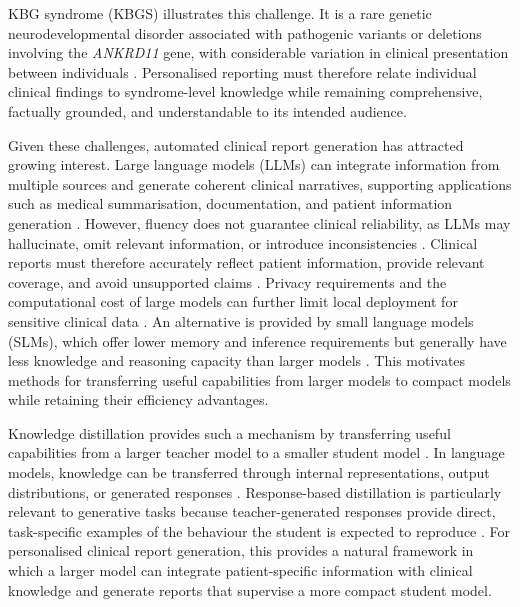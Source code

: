 \documentclass[ %
                    author={Aman Kumar Singh},
                supervisor={Dr. Edwin Simpson},
                    degree={MSc},
                     title={Quality-Aware Knowledge Distillation of Large Language Models for Efficient Personalised Clinical Report Generation},
                  subtitle={},
                      type={},
                      year={2021}]{dissertation}
\begin{document}
KBG syndrome (KBGS) illustrates this challenge. It is a rare genetic
neurodevelopmental disorder associated with pathogenic variants or deletions
involving the \textit{ANKRD11} gene, with considerable variation in clinical
presentation between individuals \cite{martinez-cayuelas_clinical_2023}.
Personalised reporting must therefore relate individual clinical findings to
syndrome-level knowledge while remaining comprehensive, factually grounded,
and understandable to its intended audience.

Given these challenges, automated clinical report generation has attracted
growing interest. Large language models (LLMs) can integrate information from
multiple sources and generate coherent clinical narratives, supporting
applications such as medical summarisation, documentation, and patient
information generation
\cite{yuan_continued_2024,rehman_advancement_2025,alabed_large_2026,
che_llm-driven_2026,makram_ai_2024}. However, fluency does not guarantee
clinical reliability, as LLMs may hallucinate, omit relevant information, or
introduce inconsistencies \cite{zeba_mitigating_2026}. Clinical reports must
therefore accurately reflect patient information, provide relevant coverage,
and avoid unsupported claims
\cite{rossi_future_2023,yang_knowledge_2022,dahlberg_measuring_2026}.
Privacy requirements and the computational cost of large models can further
limit local deployment for sensitive clinical data
\cite{annas_hipaa_2003,noauthor_eu_nodate,zhong_considerations_2025,
li_collm_2024}. An alternative is provided by small language models (SLMs),
which offer lower memory and inference requirements but generally have less
knowledge and reasoning capacity than larger models
\cite{wang_comprehensive_2025,turki_evaluating_2025}. This motivates methods
for transferring useful capabilities from larger models to compact models
while retaining their efficiency advantages.

Knowledge distillation provides such a mechanism by transferring useful
capabilities from a larger teacher model to a smaller student model
\cite{hinton_distilling_2015,wang_knowledge_2022,gou_knowledge_2021}. In
language models, knowledge can be transferred through internal
representations, output distributions, or generated responses
\cite{yang_categories_2023,habib_knowledge_2024,park_relational_2019}.
Response-based distillation is particularly relevant to generative tasks
because teacher-generated responses provide direct, task-specific examples of
the behaviour the student is expected to reproduce
\cite{chen_distilling_2021}. For personalised clinical report generation, this
provides a natural framework in which a larger model can integrate
patient-specific information with clinical knowledge and generate reports that
supervise a more compact student model.
\end{document}
